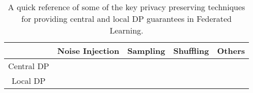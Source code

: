 \begin{table}[t]
 \centering
  \begin{tabular}{|c|c|c|c|c|}
    \hline
     &  Noise Injection & Sampling & Shuffling & Others\\
     \hline
Central DP  & \cite{Agarwal2018cpSGD, Song2013SGD} & \cite{McMahan2018Recurrent, Asoodeh2020InfoTheory, Abadi2016, Bassily2014PrivateERM} & \cite{Erlingsson2019Shuffling, Bittau2017PROCHLO, Cheu2018Distributed} & \cite{Thakkar2019AdaptiveClipping} \\
Local DP  & \cite{Ono2020LDPReinforcementLearning, Li2020SecureFLwithDP} & \cite{Balle2018AmpSubsampling, Heikkila2020DPcrossSilo} & \cite{Erlingsson2019Shuffling, Balle2019Blanket, Ghazi2019Scalable, Balle2020RandomCheckIn, Girgis2021ShuffledModel} & \cite{Smith2017Interaction, Duchi2013Local} \\

         \hline
         
 \end{tabular}
 \caption{A quick reference of some of the key privacy preserving techniques for providing central and local DP guarantees in Federated Learning.
 \label{tbl:summary}}
\end{table}


